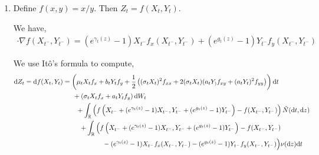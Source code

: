 \documentclass[10pt]{article}
\begin{document}
\begin{solution}[Solution]
\begin{enumerate}[label=(\alph*)]
    \item Define \( f(x,y) = x/y \). Then \( Z_t = f(X_t,Y_t) \).

        We have,
        \begin{align*}
            [(e^{\gamma_t(z)}-1)X_t; (e^{g_t(z)}-1)Y_t] \cdot \nabla f(X_{t^-},Y_{t^-}) 
            = (e^{\gamma_t(z)}-1) X_{t^-} f_x(X_{t^-},Y_{t^-}) + (e^{g_t(z)}-1)Y_{t^-} f_y(X_{t^-},Y_{t^-})
        \end{align*}

        We use It\^o's formula to compute,
        \begin{align*}
            \mathrm{d} Z_t = \mathrm{d} f(X_t,Y_t)
            &= \left( \mu_t X_t f_x + b_tY_t f_y
            + \frac{1}{2} \left( (\sigma_t X_t)^2 f_{xx} + 2(\sigma_t X_t)(a_tY_) f_{xy} + (a_tY_t)^2f_{yy} \right) \right) \mathrm{d} t
            \\& \hspace{1.5em}+ \left( \sigma_t X_t f_x + a_t Y_t f_y \right) \mathrm{d} W_t
            \\& \hspace{2em}+ \int_{\mathbb{R}} \left( f \left(X_{t^-}+(e^{\gamma_t(z)}-1)X_{t^-},Y_{t^-} + (e^{g_t(z)}-1)Y_{t^-} \right)  - f(X_{t^-},Y_{t^-}) \right) \tilde{N}(\mathrm{d} t,\mathrm{d} z)
            \\& \hspace{2.5em}+ \int_{\mathbb{R}} \Big( f \left(X_{t^-}+(e^{\gamma_t(z)}-1)X_{t^-},Y_{t^-} + (e^{g_t(z)}-1)Y_{t^-} \right)  - f(X_{t^-},Y_{t^-}) 
            \\&  \hspace{6em} - (e^{\gamma_t(z)}-1) X_{t^-} f_x(X_{t^-},Y_{t^-}) - (e^{g_t(z)}-1)Y_{t^-} f_y(X_{t^-},Y_{t^-}) \Big) \nu(\mathrm{d} z) \mathrm{d} t
        \end{align*}
       


\end{enumerate}
\end{solution}
\end{document}
